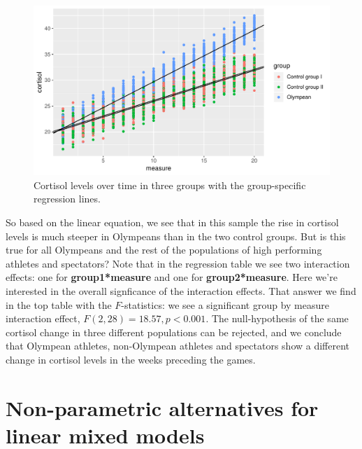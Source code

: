 \documentclass[]{book}\usepackage[]{graphicx}\usepackage[]{color}
\makeatletter
\def\maxwidth{ %
  \ifdim\Gin@nat@width>\linewidth
    \linewidth
  \else
    \Gin@nat@width
  \fi
}
\newenvironment{knitrout}{}{} %
\makeatother
\begin{document}
\begin{knitrout}
\color{fgcolor}\begin{figure}

{\centering \includegraphics[width=\maxwidth]{figure/analysismixed20_3-1} 

}

\caption[Cortisol levels over time in three groups with the group-specific regression lines]{Cortisol levels over time in three groups with the group-specific regression lines.}\label{fig:analysismixed20_3}
\end{figure}


\end{knitrout}

So based on the linear equation, we see that in this sample the rise in cortisol levels is much steeper in Olympeans than in the two control groups. But is this true for all Olympeans and the rest of the populations of high performing athletes and spectators? Note that in the regression table we see two interaction effects: one for \textbf{group1*measure} and one for \textbf{group2*measure}. Here we're interested in the overall signficance of the interaction effects. That answer we find in the top table with the $F$-statistics: we see a significant group by measure interaction effect, $F(2, 28)= 18.57, p<0.001$. The null-hypothesis of the same cortisol change in three different populations can be rejected, and we conclude that Olympean athletes, non-Olympean athletes and spectators show a different change in cortisol levels in the weeks preceding the games.  





\chapter{Non-parametric alternatives for linear mixed models}\label{chap:nonpar2}
\end{document}
